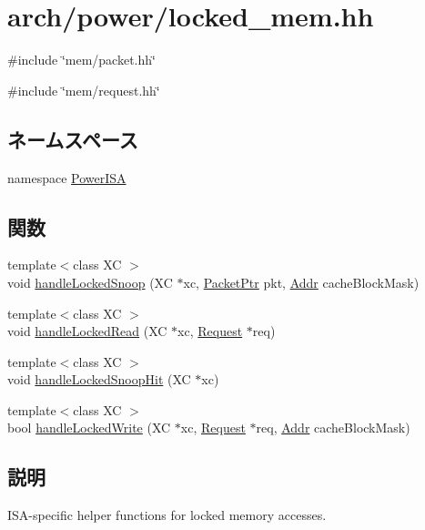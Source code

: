 \hypertarget{power_2locked__mem_8hh}{
\section{arch/power/locked\_\-mem.hh}
\label{power_2locked__mem_8hh}
}
{\ttfamily \#include \char`\"{}mem/packet.hh\char`\"{}}\par
{\ttfamily \#include \char`\"{}mem/request.hh\char`\"{}}\par
\subsection*{ネームスペース}
\begin{DoxyCompactItemize}
\item 
namespace \hyperlink{namespacePowerISA}{PowerISA}
\end{DoxyCompactItemize}
\subsection*{関数}
\begin{DoxyCompactItemize}
\item 
{\footnotesize template$<$class XC $>$ }\\void \hyperlink{namespacePowerISA_ad52b48fd509cd387fe57295ec645bed4}{handleLockedSnoop} (XC $\ast$xc, \hyperlink{classPacket}{PacketPtr} pkt, \hyperlink{base_2types_8hh_af1bb03d6a4ee096394a6749f0a169232}{Addr} cacheBlockMask)
\item 
{\footnotesize template$<$class XC $>$ }\\void \hyperlink{namespacePowerISA_ac16f0956cb4e3cb6d1bd24521a98c685}{handleLockedRead} (XC $\ast$xc, \hyperlink{classRequest}{Request} $\ast$req)
\item 
{\footnotesize template$<$class XC $>$ }\\void \hyperlink{namespacePowerISA_a00b74daf755bc384492e358e2513c483}{handleLockedSnoopHit} (XC $\ast$xc)
\item 
{\footnotesize template$<$class XC $>$ }\\bool \hyperlink{namespacePowerISA_a48135f3506457de36b02058e971a04ea}{handleLockedWrite} (XC $\ast$xc, \hyperlink{classRequest}{Request} $\ast$req, \hyperlink{base_2types_8hh_af1bb03d6a4ee096394a6749f0a169232}{Addr} cacheBlockMask)
\end{DoxyCompactItemize}


\subsection{説明}
ISA-\/specific helper functions for locked memory accesses. 